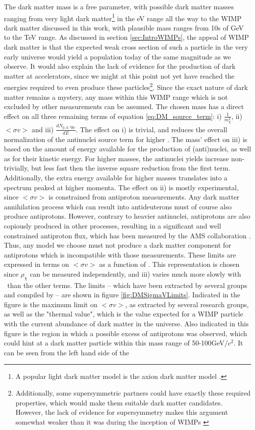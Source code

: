 The dark matter mass is a free parameter, with possible dark matter masses ranging from very light dark matter\footnote{A popular light dark matter model is the axion dark matter model \cite{}.} in the eV range all the way to the WIMP dark matter discussed in this work, with plausible mass ranges from 10s of GeV to the TeV range. As discussed in section \ref{sec:IntroWIMPs}, the appeal of WIMP dark matter is that the expected weak cross section of such a particle in the very early universe would yield a population today of the same magnitude as we observe. It would also explain the lack of evidence for the production of dark matter at accelerators, since we might at this point not yet have reached the energies required to even produce these particles\footnote{Additionally, some supersymmetric partners could have exactly these required properties, which would make them suitable dark matter candidates\cite{}. However, the lack of evidence for supersymmetry makes this argument somewhat weaker than it was during the inception of WIMPs \cite{}}. Since the exact nature of dark matter remains a mystery, any mass within this WIMP range which is not excluded by other measurements can be assumed. The chosen mass has a direct effect on all three remaining terms of equation \ref{eq:DM_source_term}: i) $\frac{1}{m_\chi^2}$, ii) $<\sigma v>$ and iii) $\frac{dN_{\mathrm{\bar{p}, \bar{d}, {^3\overline{He}}}}}{dE}$. The effect on i) is trivial, and reduces the overall normalization of the antinuclei source term for higher \dmm. The mass' effect on iii) is based on the amount of energy available for the production of (anti)nuclei, as well as for their kinetic energy. For higher masses, the antinuclei yields increase non-trivially, but less fast then the inverse square reduction from the first term. Additionally, the extra energy available for higher masses translates into a spectrum peaked at higher momenta. The effect on ii) is mostly experimental, since $<\sigma v>$ is constrained from antiproton measurements. Any dark matter annihilation process which can result into antideuterons must of course also produce antiprotons. However, contrary to heavier antinuclei, antiprotons are also copiously produced in other processes, resulting in a significant and well constrained antiproton flux, which has been measured by the AMS collaboration \cite{}. Thus, any model we choose must not produce a dark matter component for antiprotons which is incompatible with those measurements. These limits are expressed in terms on $<\sigma v>$ as a function of \dmm. This representation is chosen since $\rho_\chi$ can be measured independently, and iii) varies much more slowly with \dmm\ than the other terms. The limits -- which have been extracted by several groups \cite{} and compiled by \cite{}-- are shown in figure \ref{fig:DMSigmaVLimits}. Indicated in the figure is the maximum limit on $<\sigma v>$, as extracted by several research groups, as well as the "thermal value", which is the value expected for a WIMP particle with the current abundance of dark matter in the universe. Also indicated in this figure is the region in which a possible excess of antiprotons was observed, which could hint at a dark matter particle within this mass range of 50-100GeV/$c^2$. It can be seen from the left hand side of the 